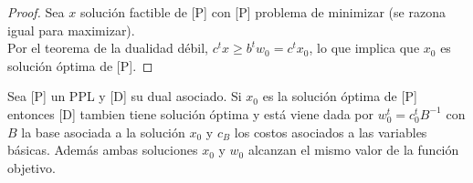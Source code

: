 \documentclass[11pt,fleqn]{book} %
\begin{document}
\begin{proof}
  Sea $x$ solución factible de [P] con [P] problema de minimizar (se razona igual para maximizar). \\
  Por el teorema de la dualidad débil, $c^t x \geq b^t w_0=c^tx_0$, lo que implica que $x_0$ es solución óptima de [P].
\end{proof}


\begin{theorem}
  Sea [P] un PPL y [D] su dual asociado. Si $x_0$ es la solución óptima de [P] entonces [D] tambien tiene solución óptima y está viene dada por $w_0^t=c_0^t B^{-1}$ con $B$ la base asociada a la solución $x_0$ y $c_B$ los costos asociados a las variables básicas. Además ambas soluciones $x_0$ y $w_0$ alcanzan el mismo valor de la función objetivo.
\end{theorem}
\end{document}
